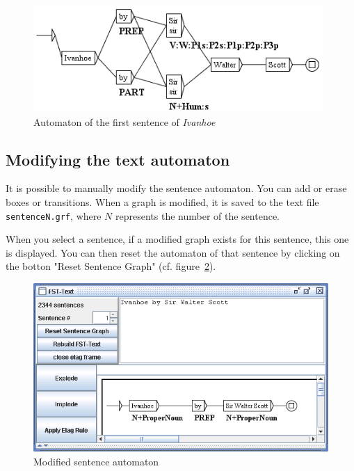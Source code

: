 \begin{figure}[!ht]
\begin{center}
\includegraphics[width=11cm]{resources/img/fig7-23.png}
\caption{Automaton of the first sentence of \textit{Ivanhoe}\label{fig-first-sentence-Ivanhoe}}
\end{center}
\end{figure}

\subsection{Modifying the text automaton}
It is possible to manually modify the sentence automaton. You can add or erase
boxes or transitions. When a graph is modified, it is saved to the text file  
\verb+sentenceN.grf+, where $N$ represents the number of the sentence.

\bigskip
\noindent When you select a sentence, if a modified graph exists for this sentence, this
one is displayed. You can then reset the automaton of that sentence by clicking
on the botton "Reset Sentence Graph" (cf. 
figure~\ref{fig-modified-sentence-automaton}).

\begin{figure}[!ht]
\begin{center}
\includegraphics[width=15cm]{resources/img/fig7-24.png}
\caption{Modified sentence automaton\label{fig-modified-sentence-automaton}}
\end{center}
\end{figure}

